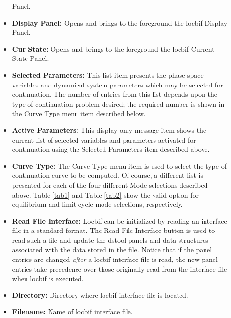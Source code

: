 \begin{description}
\begin{itemize}
		      Panel.
                \item {\bf Display Panel: }  Opens and brings to the foreground the locbif Display
		      Panel.
                \item {\bf Cur State: }  Opens and brings to the foreground the locbif Current State
		      Panel.
                \item {\bf Selected Parameters: }  This list item presents the phase space variables and
		      dynamical system parameters which may be selected for continuation.  The number of
		      entries from this list depends upon the type of continuation problem desired;  the
		      required number is shown in the Curve Type menu item described below.  
                \item {\bf Active Parameters: } This display-only message item shows the current list
		      of selected variables and parameters activated for continuation using the Selected
		      Parameters item described above.
                \item {\bf Curve Type: } The Curve Type menu item is used to select the type of continuation
		      curve to be computed.  Of course, a different list is presented for each of the four
		      different Mode selections described above.  Table \ref{tab1} and Table \ref{tab2} show the
		      valid option for equilibrium and limit cycle mode selections, respectively.
                \item {\bf Read File Interface: }  Locbif can be initialized by reading an interface file
		      in a standard format.  The Read File Interface button is used to read such a file
		      and update the dstool panels and data structures associated with the data stored in 
		      the file.  Notice that if the panel entries are changed {\em after} a locbif
		      interface file is read, the new panel entries take precedence over those originally
		      read from the interface file when locbif is executed.
                \item {\bf Directory: } Directory where locbif interface file is located.
                \item {\bf Filename: } Name of locbif interface file.
        \end{itemize}
\end{description}

